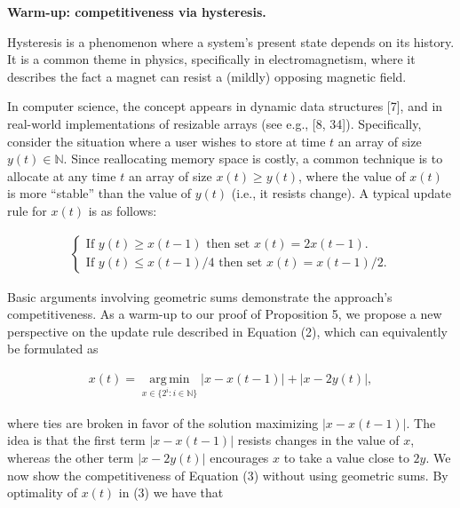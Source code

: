 \documentclass[10pt,a4paper]{article}
\begin{document}



\par\medskip\noindent\textbf{Warm-up: competitiveness via hysteresis.}\par




Hysteresis is a phenomenon where a system’s present state depends on its history. It is a common theme in physics, specifically in electromagnetism, where it describes the fact a magnet can resist a (mildly) opposing magnetic field.\par




In computer science, the concept appears in dynamic data structures [7], and in real-world implementations of resizable arrays (see e.g., [8, 34]). Specifically, consider the situation where a user wishes to store at time $t$ an array of size $y(t)\in\mathbb{N}$. Since reallocating memory space is costly, a common technique is to allocate at any time $t$ an array of size $x(t)\geq y(t)$, where the value of $x(t)$ is more “stable” than the value of $y(t)$ (i.e., it resists change). A typical update rule for $x(t)$ is as follows:\par


\[\begin{gathered}
\begin{cases}\text{If }y(t)\geq x(t-1)\text{ then set }x(t)=2x(t-1).\\
\text{If }y(t)\leq x(t-1)/4\text{ then set }x(t)=x(t-1)/2.\end{cases}
\end{gathered}\]


Basic arguments involving geometric sums demonstrate the approach’s competitiveness.
As a warm-up to our proof of Proposition 5, we propose a new perspective on the update rule described in Equation (2), which can equivalently be formulated as\par


\[\begin{gathered}
x(t)=\operatorname*{arg\,min}_{x\in\{2^{i}\colon i\in\mathbb{N}\}}|x-x(t-1)|+|x-2y(t)|,
\end{gathered}\]


where ties are broken in favor of the solution maximizing $|x-x(t-1)|$. The idea is that the first term $|x-x(t-1)|$ resists changes in the value of $x$, whereas the other term $|x-2y(t)|$ encourages $x$ to take a value close to $2y$. We now show the competitiveness of Equation (3) without using geometric sums. By optimality of $x(t)$ in (3) we have that\par
\end{document}
